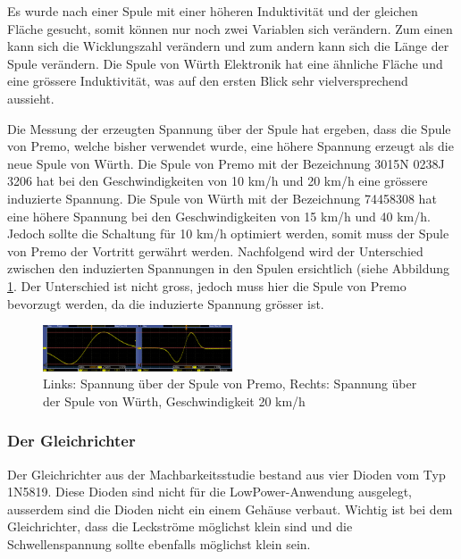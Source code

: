 
Es wurde nach einer Spule mit einer höheren Induktivität und der gleichen Fläche gesucht, somit können nur noch zwei Variablen sich verändern. Zum einen kann sich die Wicklungszahl verändern und zum andern kann sich die Länge der Spule verändern. Die Spule von Würth Elektronik hat eine ähnliche Fläche und eine grössere Induktivität, was auf den ersten Blick sehr vielversprechend aussieht.

Die Messung der erzeugten Spannung über der Spule hat ergeben, dass die Spule von Premo, welche bisher verwendet wurde, eine höhere Spannung erzeugt als die neue Spule von Würth. Die Spule von Premo mit der Bezeichnung 3015N 0238J 3206 hat bei den Geschwindigkeiten von 10 km/h und 20 km/h eine grössere induzierte Spannung. Die Spule von Würth mit der Bezeichnung 74458308 hat eine höhere Spannung bei den Geschwindigkeiten von 15 km/h und 40 km/h. Jedoch sollte die Schaltung für 10 km/h optimiert werden, somit muss der Spule von Premo der Vortritt gerwährt werden. Nachfolgend wird der Unterschied zwischen den induzierten Spannungen in den Spulen ersichtlich (siehe Abbildung \ref{messung_optimierung_spule}. Der Unterschied ist nicht gross, jedoch muss hier die Spule von Premo bevorzugt werden, da die induzierte Spannung grösser ist.

\begin{figure}[ht]
    \includegraphics[width=0.5\textwidth]{3Vorgehen/imag/Messung_Optimierung_Spule.png}
    \caption{Links: Spannung über der Spule von Premo, Rechts: Spannung über der Spule von Würth, Geschwindigkeit 20 km/h}               
    \label{messung_optimierung_spule} 
\end{figure}

\subsubsection{Der Gleichrichter}

Der Gleichrichter aus der Machbarkeitsstudie bestand aus vier Dioden vom Typ 1N5819. Diese Dioden sind nicht für die LowPower-Anwendung ausgelegt, ausserdem sind die Dioden nicht ein einem Gehäuse verbaut. Wichtig ist bei dem Gleichrichter, dass die Leckströme möglichst klein sind und die Schwellenspannung sollte ebenfalls möglichst klein sein.


